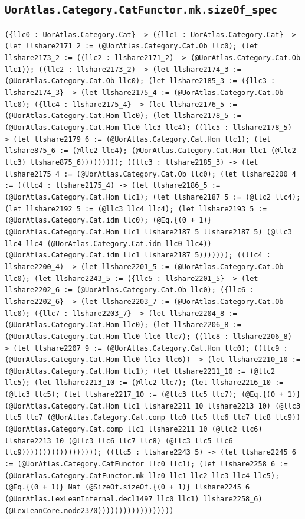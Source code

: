 \documentclass[11pt]{article}
\begin{document}
\subsection*{\texttt{UorAtlas.Category.CatFunctor.mk.sizeOf\_spec}}
\noindent\texttt{(\{llc0 : UorAtlas.Category.Cat\} -> (\{llc1 : UorAtlas.Category.Cat\} -> (let llshare2171\_2 := (@UorAtlas.Category.Cat.Ob llc0); (let llshare2173\_2 := ((llc2 : llshare2171\_2) -> (@UorAtlas.Category.Cat.Ob llc1)); ((llc2 : llshare2173\_2) -> (let llshare2174\_3 := (@UorAtlas.Category.Cat.Ob llc0); (let llshare2185\_3 := (\{llc3 : llshare2174\_3\} -> (let llshare2175\_4 := (@UorAtlas.Category.Cat.Ob llc0); (\{llc4 : llshare2175\_4\} -> (let llshare2176\_5 := (@UorAtlas.Category.Cat.Hom llc0); (let llshare2178\_5 := (@UorAtlas.Category.Cat.Hom llc0 llc3 llc4); ((llc5 : llshare2178\_5) -> (let llshare2179\_6 := (@UorAtlas.Category.Cat.Hom llc1); (let llshare875\_6 := (@llc2 llc4); (@UorAtlas.Category.Cat.Hom llc1 (@llc2 llc3) llshare875\_6))))))))); ((llc3 : llshare2185\_3) -> (let llshare2175\_4 := (@UorAtlas.Category.Cat.Ob llc0); (let llshare2200\_4 := ((llc4 : llshare2175\_4) -> (let llshare2186\_5 := (@UorAtlas.Category.Cat.Hom llc1); (let llshare2187\_5 := (@llc2 llc4); (let llshare2192\_5 := (@llc3 llc4 llc4); (let llshare2193\_5 := (@UorAtlas.Category.Cat.idm llc0); (@Eq.\{(0 + 1)\} (@UorAtlas.Category.Cat.Hom llc1 llshare2187\_5 llshare2187\_5) (@llc3 llc4 llc4 (@UorAtlas.Category.Cat.idm llc0 llc4)) (@UorAtlas.Category.Cat.idm llc1 llshare2187\_5))))))); ((llc4 : llshare2200\_4) -> (let llshare2201\_5 := (@UorAtlas.Category.Cat.Ob llc0); (let llshare2243\_5 := (\{llc5 : llshare2201\_5\} -> (let llshare2202\_6 := (@UorAtlas.Category.Cat.Ob llc0); (\{llc6 : llshare2202\_6\} -> (let llshare2203\_7 := (@UorAtlas.Category.Cat.Ob llc0); (\{llc7 : llshare2203\_7\} -> (let llshare2204\_8 := (@UorAtlas.Category.Cat.Hom llc0); (let llshare2206\_8 := (@UorAtlas.Category.Cat.Hom llc0 llc6 llc7); ((llc8 : llshare2206\_8) -> (let llshare2207\_9 := (@UorAtlas.Category.Cat.Hom llc0); ((llc9 : (@UorAtlas.Category.Cat.Hom llc0 llc5 llc6)) -> (let llshare2210\_10 := (@UorAtlas.Category.Cat.Hom llc1); (let llshare2211\_10 := (@llc2 llc5); (let llshare2213\_10 := (@llc2 llc7); (let llshare2216\_10 := (@llc3 llc5); (let llshare2217\_10 := (@llc3 llc5 llc7); (@Eq.\{(0 + 1)\} (@UorAtlas.Category.Cat.Hom llc1 llshare2211\_10 llshare2213\_10) (@llc3 llc5 llc7 (@UorAtlas.Category.Cat.comp llc0 llc5 llc6 llc7 llc8 llc9)) (@UorAtlas.Category.Cat.comp llc1 llshare2211\_10 (@llc2 llc6) llshare2213\_10 (@llc3 llc6 llc7 llc8) (@llc3 llc5 llc6 llc9)))))))))))))))))); ((llc5 : llshare2243\_5) -> (let llshare2245\_6 := (@UorAtlas.Category.CatFunctor llc0 llc1); (let llshare2258\_6 := (@UorAtlas.Category.CatFunctor.mk llc0 llc1 llc2 llc3 llc4 llc5); (@Eq.\{(0 + 1)\} Nat (@SizeOf.sizeOf.\{(0 + 1)\} llshare2245\_6 (@UorAtlas.LexLeanInternal.decl1497 llc0 llc1) llshare2258\_6) (@LexLeanCore.node2370))))))))))))))))))}\par
\end{document}
